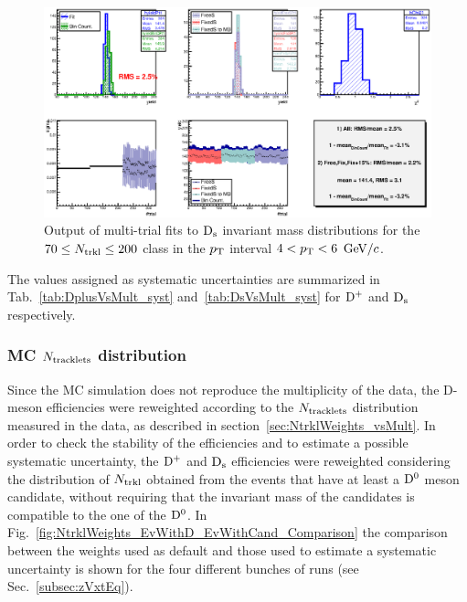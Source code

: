 \begin{figure}[htpb]
\centering
 \includegraphics[width=.9\textwidth]{FigCap6/MT_Pt1_70200.eps}
 \caption{Output of multi-trial fits to ${\rm D_s}$ invariant mass distributions for the $70 \leq N_{\rm trkl} \leq 200$ class in the $p_{\rm T}$ interval $  4< p_{\rm T} < 6$ $\mathrm{GeV}/c$.}
 \label{fig:DplusMultiTrial_3}
\end{figure}

The values assigned as systematic uncertainties are summarized in Tab.~\ref{tab:DplusVsMult_syst} and~\ref{tab:DsVsMult_syst} for ${\rm D^+}$ and ${\rm D_s}$ respectively.

\subsubsection{MC $N_{\rm tracklets}$ distribution}
Since the MC simulation does not reproduce the multiplicity of the data, the D-meson efficiencies were reweighted according to the $N_{\rm tracklets}$ distribution measured in the data, as described in section~\ref{sec:NtrklWeights_vsMult}. In order to check the stability of the efficiencies and to estimate a possible systematic uncertainty, the ${\rm D^+}$ and ${\rm D_s}$ efficiencies were reweighted considering the distribution of $N_{\rm trkl}$ obtained from the events that have at least a ${\rm D^0}$ meson candidate, without requiring that the invariant mass of the candidates is compatible to the one of the ${\rm D^0}$. In Fig.~\ref{fig:NtrklWeights_EvWithD_EvWithCand_Comparison} the comparison between the weights used as default and those used to estimate a systematic uncertainty is shown for the four different bunches of runs (see Sec.~\ref{subsec:zVxtEq}).

